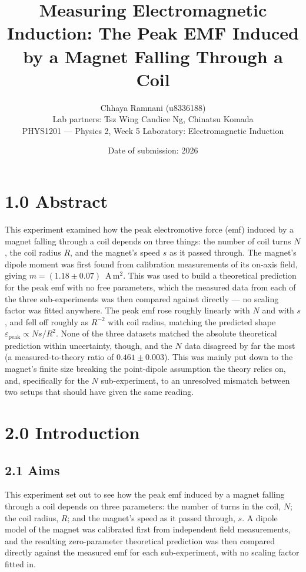 \documentclass[11pt]{article}
\title{\textbf{Measuring Electromagnetic Induction: The Peak EMF Induced by a Magnet Falling Through a Coil}}
\author{Chhaya Ramnani (u8336188)\\ \small Lab partners: Tsz Wing Candice Ng, Chinatsu Komada\\ \small PHYS1201 --- Physics 2, Week 5 Laboratory: Electromagnetic Induction}
\date{Date of submission: 2026}
\begin{document}
\maketitle
\thispagestyle{empty}

\section*{1.0 Abstract}
This experiment examined how the peak electromotive force (emf) induced by a magnet falling through a coil depends on three things: 
the number of coil turns $N$, the coil radius $R$, and the magnet's speed $s$ as it passed through. The magnet's dipole moment was 
first found from calibration measurements of its on-axis field, giving $m = (1.18 \pm 0.07)$~A\,m$^2$. This was used to build a 
theoretical prediction for the peak emf with no free parameters, which the measured data from each of the three sub-experiments was 
then compared against directly --- no scaling factor was fitted anywhere. The peak emf rose roughly linearly with $N$ and with $s$, 
and fell off roughly as $R^{-2}$ with coil radius, matching the predicted shape $\varepsilon_{\text{peak}} \propto Ns/R^2$. None of 
the three datasets matched the absolute theoretical prediction within uncertainty, though, and the $N$ data disagreed by far the most 
(a measured-to-theory ratio of $0.461 \pm 0.003$). This was mainly put down to the magnet's finite size breaking the point-dipole 
assumption the theory relies on, and, specifically for the $N$ sub-experiment, to an unresolved mismatch between two setups that should 
have given the same reading.

\section*{2.0 Introduction}

\subsection*{2.1 Aims}
This experiment set out to see how the peak emf induced by a magnet falling through a coil depends on three parameters: the number of 
turns in the coil, $N$; the coil radius, $R$; and the magnet's speed as it passed through, $s$. A dipole model of the magnet was calibrated 
first from independent field measurements, and the resulting zero-parameter theoretical prediction was then compared directly against the 
measured emf for each sub-experiment, with no scaling factor fitted in.
\end{document}
